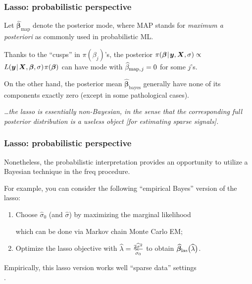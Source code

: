 \documentclass[18pt]{beamer}
\newcommand{\defineTightSpacing}{%
	\setlength{\abovedisplayskip}{.25\baselineskip}%
	\setlength{\belowdisplayskip}{.25\baselineskip}%
}
\newenvironment{tightEquation*}{%
	\defineTightSpacing%
	\begin{equation*}
}{
	\end{equation*} \ignorespacesafterend
}
\newenvironment{tightEnumerate}[1][1.]{%
  \vspace{-.3\baselineskip}%
  \begin{enumerate}[#1]
  \addtolength\itemsep{-.1\baselineskip}
}{
  \end{enumerate}
}
\renewcommand{\textsc}[1]{{\small \MakeUppercase{#1}}}
\newcommand{\given}{\thinnerspace | \thinnerspace}
\newcommand{\diff}{\operatorname{\mathrm{d}}\!{}}
\newcommand{\thinnerspace}{\mskip.5\thinmuskip}
\newcommand{\density}{\pi}
\newcommand{\likelihood}{L}
\newcommand{\by}{\bm{y}}
\newcommand{\bX}{\bm{X}}
\newcommand{\bbeta}{\bm{\beta}}
\begin{document}
\begin{frame}
\frametitle{Lasso: probabilistic perspective}
Let $\widehat{\bbeta}_{\mathrm{map}}$ denote the posterior mode, where \textsc{MAP} stands for \textit{maximum a posteriori} as commonly used in probabilistic \textsc{ML}.

\smallskip
Thanks to the ``cusps'' in $\density(\beta_j)$'s, the posterior $\density(\bbeta \given \by, \bX, \sigma) \propto$ $\likelihood(\by \given \bX, \bbeta, \sigma) \thinnerspace \density(\bbeta)$ can have mode with $\widehat{\beta}_{\mathrm{map}, \thinnerspace j} = 0$ for some $j$'s.

\smallskip
On the other hand, the posterior mean $\widehat{\bbeta}_{\mathrm{bayes}}$ generally have none of its components exactly zero (except in some pathological cases).

\begin{center}
\begin{minipage}{.88\linewidth}
{\slshape
\ldots the lasso is essentially non-Bayesian, in the sense that the corresponding full posterior distribution is a useless object [for estimating sparse signals].}
\hfill \citep{castillo2015bayes_sparse_reg}
\end{minipage}
\end{center}
\end{frame}


\begin{frame}
\frametitle{Lasso: probabilistic perspective}
Nonetheless, the probabilistic interpretation provides an opportunity to utilize a Bayesian technique in the freq procedure.

\smallskip
For example, you can consider the following ``empirical Bayes'' version of the lasso:
\begin{tightEnumerate}
\item Choose $\widehat{\sigma}_0$ (and $\widehat{\sigma}$) by maximizing the marginal likelihood
	which can be done via Markov chain Monte Carlo EM;
\item Optimize the lasso objective with $\widehat{\lambda} = \frac{2 \widehat{\sigma}^2}{\widehat{\sigma}_0}$ to obtain $\widehat{\bbeta}_{\mathrm{las}}\big(\widehat{\penaltyParam}\big)$.
\end{tightEnumerate} 

\smallskip
Empirically, this lasso version works well ``sparse data'' settings \\ \hfill \citep{nishimura2023regularized_shrinkage}.
\end{frame}
\end{document}
